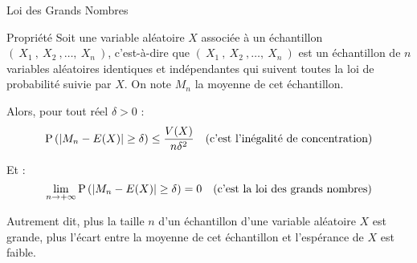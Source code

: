 \documentclass{cours}
\begin{document}
    \begin{Gpartie}{Loi des Grands Nombres} 
        \begin{Spartie}{Propriété} 
            Soit une variable aléatoire $X$ associée à un échantillon $\left(~X_1~,~X_2~,\dotsc,~X_n~\right)$, c'est-à-dire que $\left(~X_1~,~X_2~,\dotsc,~X_n~\right)$ est un échantillon de $n$ variables aléatoires identiques et indépendantes qui suivent toutes la loi de probabilité suivie par $X$. On note $M_n$ la moyenne de cet échantillon. 
            
            Alors, pour tout réel $\delta>0$ : \[\mathrm{P}\left(\lvert M_n-E(X)\rvert\geq\delta\right)\leq\frac{V(X)}{n\delta^2}\quad\text{(c'est l'inégalité de concentration)}\]

            Et : \[\lim\limits_{n\to +\infty}\mathrm{P}\left(\lvert M_n-E(X)\rvert\geq\delta\right)=0\quad\text{(c'est la loi des grands nombres)}\]

            Autrement dit, plus la taille $n$ d'un échantillon d'une variable aléatoire $X$ est grande, plus l'écart entre la moyenne de cet échantillon et l'espérance de $X$ est faible.
        \end{Spartie}
    \end{Gpartie}
\end{document}
